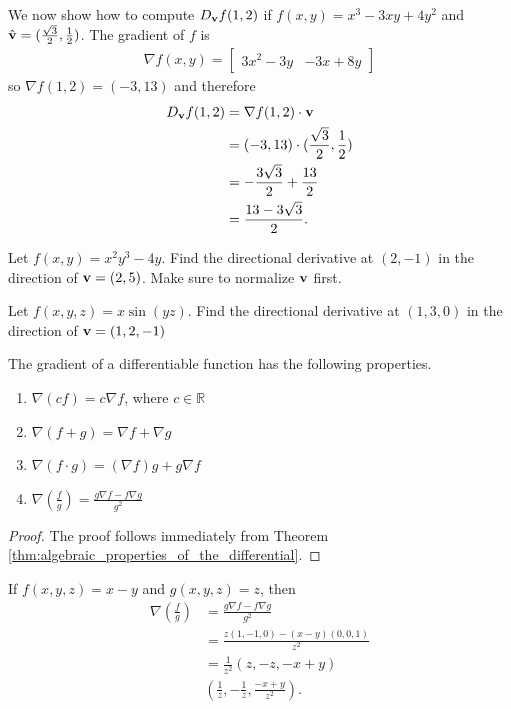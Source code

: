 \documentclass[12pt,letterpaper,reqno]{article}
\numberwithin{equation}{section}
\newcommand{\R}{\ensuremath{\mathbb R}}
\newcommand{\bv}{{\bf v}}
\begin{document}
{\begin{example}
We now show how to compute $D_{\bv}f(1,2)$ if  $f(x,y)=x^3-3xy+4y^2$ and $\hat{\bv}=(\frac{\sqrt{3}}{2},\frac{1}{2})$.	 The gradient of $f$ is 
\begin{align*}
	\nabla f(x,y)=\begin{bmatrix}
		3x^2-3y & -3x+8y
	\end{bmatrix}
\end{align*}
so $\nabla f(1,2)=(-3,13)$ and therefore
\begin{align*}
	D_\bv f(1,2)&=\nabla f(1,2) \cdot \bv \\
	&=(-3,13) \cdot (\frac{\sqrt{3}}{2},\frac{1}{2}) \\
	&=-\frac{3\sqrt{3}}{2}+\frac{13}{2} \\
	&=\frac{13-3\sqrt{3}}{2}.
\end{align*}
\end{example}

\begin{exercise}
Let $f(x,y)=x^2y^3-4y$. Find the directional derivative at $(2,-1)$ in the direction of $\bv=(2,5)$. Make sure to normalize $\bv$ first.	
\end{exercise}

\begin{exercise}
Let $f(x,y,z)=x \sin(yz)$. Find the directional derivative at $(1,3,0)$ in the direction of $\bv=(1,2,-1)$ 	
\end{exercise}

\begin{thm}
The gradient of a differentiable function has the following properties.
	\begin{enumerate}
		\item $\nabla (cf)=c \nabla f$, where $c \in \R$
		\item $\nabla(f+g)=\nabla f + \nabla g$
		\item $\nabla(f \cdot g)=(\nabla f)g+g\nabla f$
		\item $\nabla\left(\frac{f}{g}\right)=\frac{g \nabla f-f \nabla g}{g^2}$
	\end{enumerate}
\end{thm}

\begin{proof}
	The proof follows immediately from Theorem \ref{thm:algebraic_properties_of_the_differential}.
\end{proof}

\begin{example}
If $f(x,y,z)=x-y$ and $g(x,y,z)=z$, then
\begin{align*}
	\nabla\left(\frac{f}{g}\right)&=\frac{g \nabla f-f \nabla g}{g^2} \\
	&=\frac{z(1,-1,0)-(x-y)(0,0,1)}{z^2} \\
	&=\frac{1}{z^2}(z,-z,-x+y) \\
	&(\frac{1}{z},-\frac{1}{z},\frac{-x+y}{z^2}).
\end{align*}	
\end{example}

}
\end{document}
